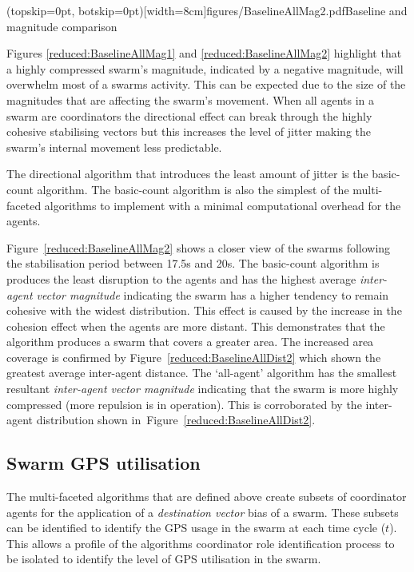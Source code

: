 \documentclass{ieeeaccess}
\begin{document}
\Figure[t!](topskip=0pt, botskip=0pt)[width=8cm]{figures/BaselineAllMag2.pdf}{Baseline and magnitude comparison\label{reduced:BaselineAllMag2}}

Figures \ref{reduced:BaselineAllMag1} and \ref{reduced:BaselineAllMag2} highlight that a highly compressed swarm's magnitude, indicated by a negative magnitude, will overwhelm most of a swarms activity. This can be expected due to the size of the magnitudes that are affecting the swarm's movement. When all agents in a swarm are coordinators the directional effect can break through the highly cohesive stabilising vectors but this increases the level of jitter making the swarm's internal movement less predictable.

The directional algorithm that introduces the least amount of jitter is the basic-count algorithm. The basic-count algorithm is also the simplest of the multi-faceted algorithms to implement with a minimal computational overhead for the agents. 

Figure~\ref{reduced:BaselineAllMag2} shows a closer view of the swarms following the stabilisation period between 17.5s and 20s. The basic-count algorithm is produces the least disruption to the agents and has the highest average \textit{inter-agent vector magnitude} indicating the swarm has a higher tendency to remain cohesive with the widest distribution. This effect is caused by the increase in the cohesion effect when the agents are more distant. This demonstrates that the algorithm produces a swarm that covers a greater area. The increased area coverage is confirmed by Figure~\ref{reduced:BaselineAllDist2} which shown the greatest average inter-agent distance. The `all-agent' algorithm has the smallest resultant \textit{inter-agent vector magnitude} indicating that the swarm is more highly compressed (more repulsion is in operation). This is corroborated by the inter-agent distribution shown in~Figure~\ref{reduced:BaselineAllDist2}.

\subsection{Swarm GPS utilisation\label{section:compareGPSUages1}}
The multi-faceted algorithms that are defined above create subsets of coordinator agents for the application of a \textit{destination vector} bias of a swarm. These subsets can be identified to identify the GPS usage in the swarm at each time cycle ($t$). This allows a profile of the algorithms coordinator role identification process to be isolated to identify the level of GPS utilisation in the swarm.
\end{document}
